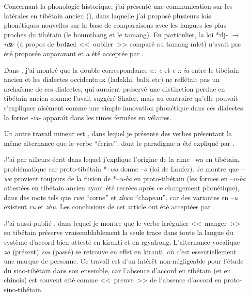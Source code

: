 \documentclass[oldfontcommands,oneside,a4paper,11pt]{memoir}
\newcommand{\ipa}[1]{{\phon #1}} %
\begin{document}
Concernant la phonologie historique, j’ai présenté une communication sur les latérales en tibétain ancien (\citealt{jacques04thimphu}), dans laquelle j’ai proposé plusieurs lois phonétiques nouvelles sur la base de comparaisons avec les langues les plus proches du tibétain (le boumthang et le tamang). En particulier, la loi *rlj- $\rightarrow $ \textit{rdʑ}- (à propos de \ipa{brdʑed} <<~oublier~>> comparé au tamang \ipa{mlet}) n'avait pas été proposée auparavant et a été acceptée par \citet{hill13laterals}.

Dans \citet{jacques09e}, j'ai montré que la double correspondance \textit{e}:: \textit{e} et \textit{e} :: \textit{ia} entre le tibétain ancien et les dialectes occidentaux (ladakhi, balti etc) ne reflétait pas un archaïsme de ces dialectes, qui auraient préservé une distinction perdue en tibétain ancien comme l'avait suggéré Shafer, mais au contraire qu'elle pouvait s'expliquer aisément comme une simple innovation phonétique dans ces dialectes: la forme \textit{-ia-} apparaît dans les rimes fermées en vélaires.

Un autre travail mineur est \citet{jacques10ndr}, dans lequel je présente des verbes présentant la même alternance que le verbe ``écrire'', dont le paradigme a été expliqué par \citet{hill05vbri}.

J'ai par ailleurs écrit \citet{jacques09wazur} dans lequel j'explique l'origine de la rime --wa en tibétain, problématique car proto-tibétain *--\textit{wa} donne --\textit{o} (loi de Laufer). Je montre que --\textit{wa} provient toujours de la fusion de *--\textit{u-ba} en proto-tibétain (les formes en --\textit{u-ba} attestées en tibétain ancien ayant été recrées après ce changement phonétique), dans des mots tels que \textit{rwa} ``corne'' et \textit{zhwa} ``chapeau'', car des variantes en --\textit{u} existent \textit{ru} et \textit{zhu}. Les conclusions de cet article ont été acceptées par \citealt{hill11laws}.

J'ai aussi publié \citet{jacques10zos}, dans lequel je montre que le verbe irrégulier <<~manger~>> en tibétain préserve vraisemblablement la seule trace dans toute la langue du système d'accord bien attesté en kiranti et en rgyalrong. L'alternance vocalique \textit{za} (présent) \textit{zos} (passé) se retrouve en effet en kiranti, où c'est essentiellement une marque de personne.
Ce travail est d'un intérêt non-négligeable pour l'étude du sino-tibétain dans son ensemble, car l'absence d'accord en tibétain (et en chinois) est souvent cité comme <<~preuve~>> de l'absence d'accord en proto-sino-tibétain.
\end{document}
